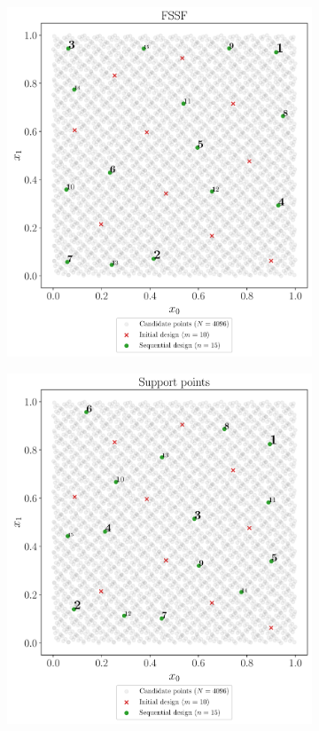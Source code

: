 \begin{figure}
  \centering
  \begin{subfigure}[b]{0.48\linewidth}
    \centering
    \includegraphics[width=\textwidth]{./part2/figures/SIS/uniform2D_FSSF.pdf}
  \end{subfigure}
  \begin{subfigure}[b]{0.48\linewidth}
    \centering
    \includegraphics[width=\textwidth]{./part2/figures/SIS/uniform2D_SP.pdf}

\end{subfigure}
\end{figure}

